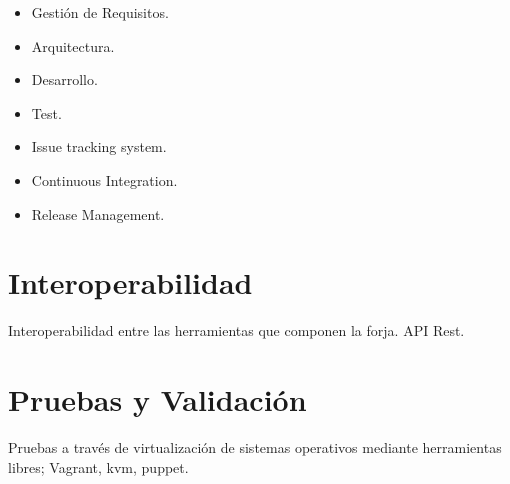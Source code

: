 \begin{itemize}
	\item Gesti\'on de Requisitos.
	\item Arquitectura.
	\item Desarrollo.
	\item Test.
	\item Issue tracking system.
	\item Continuous Integration.
	\item Release Management.
\end{itemize}


\section{Interoperabilidad}
\label{sec:interoperabilidad}

\par Interoperabilidad entre las herramientas que componen la forja. API Rest.


\section{Pruebas y Validación}
\label{sec:pruebas-validacion}

\par Pruebas a trav\'es de virtualizaci\'on de sistemas operativos mediante herramientas libres; Vagrant, kvm, puppet.


